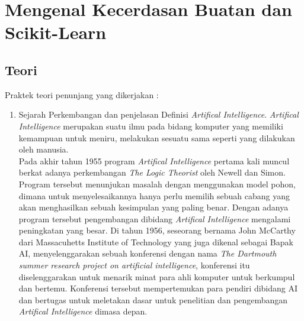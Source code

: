 \chapter{Mengenal Kecerdasan Buatan dan Scikit-Learn}

\section{Teori}
Praktek teori penunjang yang dikerjakan :
\begin{enumerate}
	\item Sejarah Perkembangan dan penjelasan Definisi \textit{Artifical Intelligence}. \textit{Artifical Intelligence} merupakan suatu ilmu pada bidang komputer yang memiliki 
	kemampuan untuk meniru, melakukan sesuatu sama seperti yang dilakukan oleh manusia.\\
	Pada akhir tahun 1955 program \textit{Artifical Intelligence} pertama kali muncul berkat adanya perkembangan \textit{The Logic Theorist} oleh Newell dan Simon. 
	Program tersebut menunjukan masalah dengan menggunakan model pohon, dimana untuk menyelesaikannya hanya perlu memilih sebuah cabang yang akan menghasilkan sebuah kesimpulan yang paling
	benar. Dengan adanya program tersebut pengembangan dibidang  \textit{Artifical Intelligence} mengalami peningkatan yang besar. Di tahun 1956, seseorang bernama John McCarthy dari 
	Massacuhetts Institute of Technology yang juga dikenal sebagai Bapak AI, menyelenggarakan sebuah konferensi dengan nama \textit{The Dartmouth summer research project on artificial intelligence},
	konferensi itu diselenggarakan untuk menarik minat para ahli komputer untuk berkumpul dan bertemu. Konferensi tersebut mempertemukan para pendiri dibidang AI dan bertugas untuk meletakan
	dasar untuk penelitian dan pengembangan \textit{Artifical Intelligence} dimasa depan.
	

\end{enumerate}
